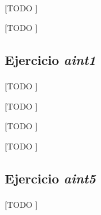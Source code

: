 \documentclass[spanish]{article}
\begin{document}
			\paragraph{}
			[TODO ]

			\begin{table}[p]
				\begin{center}
				\end{center}
				\caption{[TODO ]}
				\label{}
			\end{table}

		\subsection{Ejercicio \emph{aint1}}
		\label{sec:e-6.2a}

			\paragraph{}
			[TODO ]

			\begin{table}[p]
				\begin{center}
				\end{center}
				\caption{[TODO ]}
				\label{}
			\end{table}

			\begin{table}[p]
				\begin{center}
				\end{center}
				\caption{[TODO ]}
				\label{}
			\end{table}

			\begin{table}[p]
				\begin{center}
				\end{center}
				\caption{[TODO ]}
				\label{}
			\end{table}

		\subsection{Ejercicio \emph{aint5}}
		\label{sec:e-6.2b}

			\paragraph{}
			[TODO ]
\end{document}
